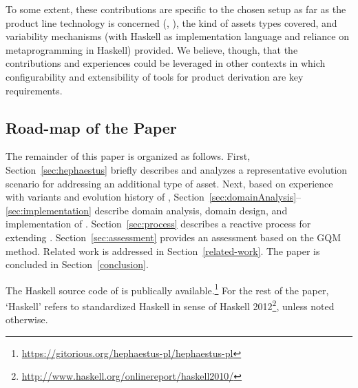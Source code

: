 To some extent, these contributions are specific to the chosen setup as far as the product line technology is concerned (\hp, \hpl), the kind of assets types covered, and variability mechanisms (with Haskell as implementation language and reliance on metaprogramming in Haskell) provided. We believe, though, that the contributions and experiences could be leveraged in other contexts in which configurability and extensibility of tools for product derivation are key requirements.


\subsection*{Road-map of the Paper}

The remainder of this paper is organized as follows. First, Section~\ref{sec:hephaestus} briefly describes \hp{} and analyzes a representative evolution scenario for addressing an additional type of asset. Next, based on experience with variants and evolution history of \hp, Section~\ref{sec:domainAnalysis}--\ref{sec:implementation} describe 
domain analysis, domain design, and implementation of \hpl. Section~\ref{sec:process} describes a reactive process for extending \hpl. Section~\ref{sec:assessment} provides an assessment \hpl{} based on the GQM method. Related work is addressed in Section~\ref{related-work}. The paper is concluded in Section~\ref{conclusion}. 

The Haskell source code of \hpl{} is publically available.\footnote{\url{https://gitorious.org/hephaestus-pl/hephaestus-pl}} For the rest of the paper, `Haskell' refers to standardized Haskell in sense of Haskell 2012\footnote{\url{http://www.haskell.org/onlinereport/haskell2010/}}, unless noted otherwise.

